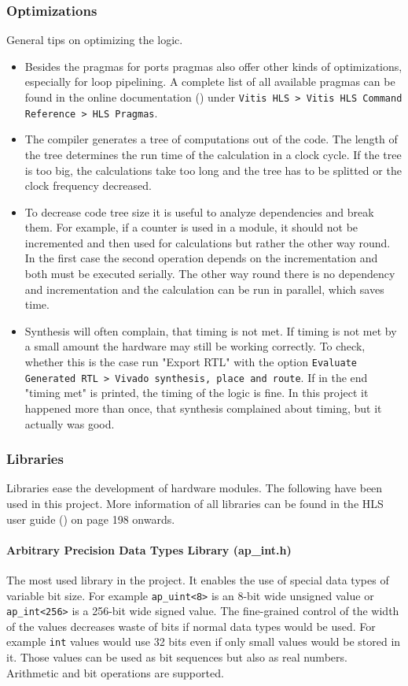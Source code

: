 \subsubsection{Optimizations}
General tips on optimizing the logic.
\begin{itemize}
  \item Besides the pragmas for ports pragmas also offer other kinds of optimizations, especially for loop pipelining. A complete list of all available pragmas can be found in the online documentation (\cite{xilinx:online_docs}) under \texttt{Vitis HLS > Vitis HLS Command Reference > HLS Pragmas}.
  \item The compiler generates a tree of computations out of the code. The length of the tree determines the run time of the calculation in a clock cycle. If the tree is too big, the calculations take too long and the tree has to be splitted or the clock frequency decreased.
  \item To decrease code tree size it is useful to analyze dependencies and break them. For example, if a counter is used in a module, it should not be incremented and then used for calculations but rather the other way round. In the first case the second operation depends on the incrementation and both must be executed serially. The other way round there is no dependency and incrementation and the calculation can be run in parallel, which saves time.
  \item Synthesis will often complain, that timing is not met. If timing is not met by a small amount the hardware may still be working correctly. To check, whether this is the case run "Export RTL" with the option \texttt{Evaluate Generated RTL > Vivado synthesis, place and route}. If in the end "timing met" is printed, the timing of the logic is fine. In this project it happened more than once, that synthesis complained about timing, but it actually was good.
\end{itemize}

\subsubsection{Libraries}
Libraries ease the development of hardware modules. The following have been used in this project. More information of all libraries can be found in the HLS user guide (\cite{xilinx:hls_bible}) on page 198 onwards.

\paragraph{Arbitrary Precision Data Types Library (ap\_int.h)}
The most used library in the project. It enables the use of special data types of variable bit size. For example \texttt{ap\_uint<8>} is an 8-bit wide unsigned value or \texttt{ap\_int<256>} is a 256-bit wide signed value.
The fine-grained control of the width of the values decreases waste of bits if normal data types would be used. For example \texttt{int} values would use 32 bits even if only small values would be stored in it.
Those values can be used as bit sequences but also as real numbers. Arithmetic and bit operations are supported.

